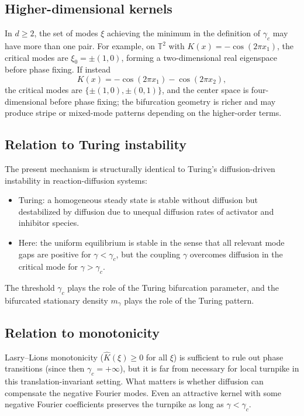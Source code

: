 \documentclass[11pt]{amsart}
\theoremstyle{definition}
\theoremstyle{remark}
\newcommand{\Kh}{\widehat{K}}
\newcommand{\gamc}{\gamma_c}
\begin{document}
\subsection{Higher-dimensional kernels}
\label{sub:higher-d}

In $d\ge 2$, the set of modes $\xi$ achieving the minimum in the definition of $\gamc$ may have more than one pair. For example, on $\mathbb{T}^2$ with $K(x)=-\cos(2\pi x_1)$, the critical modes are $\xi_0=\pm(1,0)$, forming a two-dimensional real eigenspace before phase fixing. If instead
\[
K(x)=-\cos(2\pi x_1)-\cos(2\pi x_2),
\]
the critical modes are $\{\pm(1,0),\pm(0,1)\}$, and the center space is four-dimensional before phase fixing; the bifurcation geometry is richer and may produce stripe or mixed-mode patterns depending on the higher-order terms.

\subsection{Relation to Turing instability}
\label{sub:turing}

The present mechanism is structurally identical to Turing's diffusion-driven instability \cite{T52} in reaction-diffusion systems:
\begin{itemize}
\item Turing: a homogeneous steady state is stable without diffusion but destabilized by diffusion due to unequal diffusion rates of activator and inhibitor species.
\item Here: the uniform equilibrium is stable in the sense that all relevant mode gaps are positive for $\gamma<\gamc$, but the coupling $\gamma$ overcomes diffusion in the critical mode for $\gamma>\gamc$.
\end{itemize}
The threshold $\gamc$ plays the role of the Turing bifurcation parameter, and the bifurcated stationary density $m_\gamma$ plays the role of the Turing pattern.

\subsection{Relation to monotonicity}
\label{sub:monotonicity-remark}

Lasry--Lions monotonicity ($\Kh(\xi)\ge 0$ for all $\xi$) is sufficient to rule out phase transitions (since then $\gamc=+\infty$), but it is far from necessary for local turnpike in this translation-invariant setting. What matters is whether diffusion can compensate the negative Fourier modes. Even an attractive kernel with some negative Fourier coefficients preserves the turnpike as long as $\gamma<\gamc$.
\end{document}
